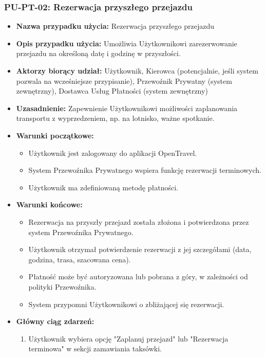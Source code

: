 \documentclass[a4paper,12pt]{article}
\begin{document}
\subsubsection{PU-PT-02: Rezerwacja przyszłego przejazdu}
\begin{itemize}
    \item \textbf{Nazwa przypadku użycia:} Rezerwacja przyszłego przejazdu
    \item \textbf{Opis przypadku użycia:} Umożliwia Użytkownikowi zarezerwowanie przejazdu na określoną datę i godzinę w przyszłości.
    \item \textbf{Aktorzy biorący udział:} Użytkownik, Kierowca (potencjalnie, jeśli system pozwala na wcześniejsze przypisanie), Przewoźnik Prywatny (system zewnętrzny), Dostawca Usług Płatności (system zewnętrzny)
    \item \textbf{Uzasadnienie:} Zapewnienie Użytkownikowi możliwości zaplanowania transportu z wyprzedzeniem, np. na lotnisko, ważne spotkanie.
    \item \textbf{Warunki początkowe:}
        \begin{itemize}
            \item Użytkownik jest zalogowany do aplikacji OpenTravel.
            \item System Przewoźnika Prywatnego wspiera funkcję rezerwacji terminowych.
            \item Użytkownik ma zdefiniowaną metodę płatności.
        \end{itemize}
    \item \textbf{Warunki końcowe:}
        \begin{itemize}
            \item Rezerwacja na przyszły przejazd została złożona i potwierdzona przez system Przewoźnika Prywatnego.
            \item Użytkownik otrzymał potwierdzenie rezerwacji z jej szczegółami (data, godzina, trasa, szacowana cena).
            \item Płatność może być autoryzowana lub pobrana z góry, w zależności od polityki Przewoźnika.
            \item System przypomni Użytkownikowi o zbliżającej się rezerwacji.
        \end{itemize}
    \item \textbf{Główny ciąg zdarzeń:}
        \begin{enumerate}
            \item Użytkownik wybiera opcję "Zaplanuj przejazd" lub "Rezerwacja terminowa" w sekcji zamawiania taksówki.

\end{enumerate}
\end{itemize}
\end{document}
